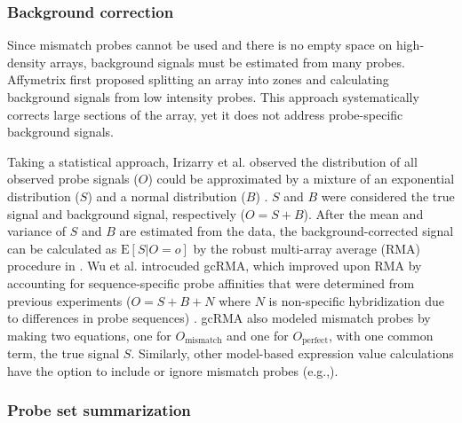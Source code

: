\subsubsection{Background correction}

Since mismatch probes cannot be used and there is no 
empty space on high-density arrays, 
background signals must be estimated from many
probes. Affymetrix first proposed splitting an array
into zones and calculating background signals from low
intensity probes. This approach systematically corrects large
sections of the array,
yet it does not address probe-specific background signals.

Taking a statistical approach, 
Irizarry et al. observed the distribution
of all observed probe signals ($O$) could be approximated by
a mixture of an exponential distribution ($S$) and a
normal distribution ($B$) \cite{Irizarry:2003ge}.
$S$ and $B$ were considered the true signal and background signal, respectively ($O=S+B$).
After the mean and variance of $S$ and $B$ are estimated from the data, 
the background-corrected signal can be calculated 
as $\text{E}[S|O=o]$ by the robust multi-array average (RMA) procedure in
\cite{Irizarry:2003ge}. 
Wu et al. introcuded gcRMA, which improved upon RMA by 
accounting for sequence-specific probe
affinities that were determined from previous experiments
($O=S+B+N$ where $N$ is non-specific hybridization due to
differences in probe sequences) \cite{Wu:2004wh}. gcRMA
also modeled mismatch probes by making two equations, one for 
$O_{\text{mismatch}}$ and one for $O_{\text{perfect}}$, with one common 
term, the true signal $S$. 
Similarly, other model-based expression value calculations
have the option to include or ignore
mismatch probes (e.g.,\cite{Li:2001jv,Milo:2003tt}).

\subsubsection{Probe set summarization}

